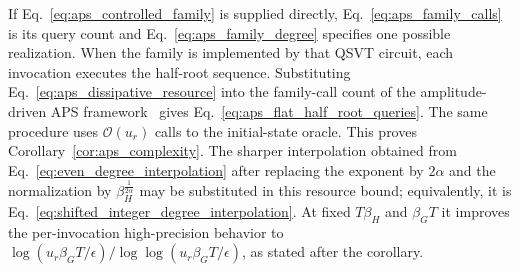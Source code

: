 \documentclass[aps,pra,reprint,floatfix,unsortedaddress,superscriptaddress]{revtex4-2}
\newcommand{\Ocal}{\mathcal{O}}
\begin{document}
If Eq.~\eqref{eq:aps_controlled_family} is supplied directly,
Eq.~\eqref{eq:aps_family_calls} is its query count and
Eq.~\eqref{eq:aps_family_degree} specifies one possible realization.
When the family is implemented by that QSVT circuit, each invocation
executes the half-root sequence.  Substituting
Eq.~\eqref{eq:aps_dissipative_resource} into the family-call count of
the amplitude-driven APS framework~\cite{hu2026quantumsimulationnonunitarydynamics} gives
Eq.~\eqref{eq:aps_flat_half_root_queries}.  The same procedure
uses $\Ocal(u_r)$ calls to the initial-state oracle.  This proves
Corollary~\ref{cor:aps_complexity}.
The sharper interpolation obtained from
Eq.~\eqref{eq:even_degree_interpolation} after replacing the exponent by
$2\alpha$ and the normalization by $\beta_H^{\frac{1}{2\alpha}}$
may be substituted in this resource bound; equivalently, it is
Eq.~\eqref{eq:shifted_integer_degree_interpolation}.  At fixed
$T\beta_H$ and $\beta_G T$ it
improves the per-invocation high-precision behavior to
$\log(u_r\beta_G T/\epsilon)/\log\log(u_r\beta_G T/\epsilon)$, as stated
after the corollary.
\end{document}
